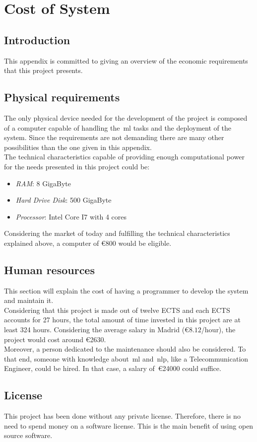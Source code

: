 \appendix
\chapter{Cost of System}
\section{Introduction}
This appendix is committed to giving an overview of the economic requirements that this project presents.
\section{Physical requirements}
The only physical device needed for the development of the project is composed of a computer capable of handling the~\ac{ml} tasks and the deployment of the system. Since the requirements are not demanding there are many other possibilities than the one given in this appendix.\\
The technical characteristics capable of providing enough computational power for the needs presented in this project could be:
\begin{itemize}
	\item \textit{RAM}: 8 GigaByte
	\item \textit{Hard Drive Disk}: 500 GigaByte
	\item \textit{Processor}: Intel Core I7 with 4 cores
\end{itemize}
Considering the market of today and fulfilling the technical characteristics explained above, a computer of \euro{800} would be eligible.
\section{Human resources}
This section will explain the cost of having a programmer to develop the system and maintain it.\\
Considering that this project is made out of twelve ECTS and each ECTS accounts for 27 hours, the total amount of time invested in this project are at least 324 hours. Considering the average salary in Madrid (\euro{$8.12$}/hour), the project would cost around \euro{2630}.\\
Moreover, a person dedicated to the maintenance should also be considered. To that end, someone with knowledge about~\ac{ml} and~\ac{nlp}, like a Telecommunication Engineer, could be hired. In that case, a salary of~\euro{24000} could suffice.
\section{License}
This project has been done without any private license. Therefore, there is no need to spend money on a software license. This is the main benefit of using open source software. 